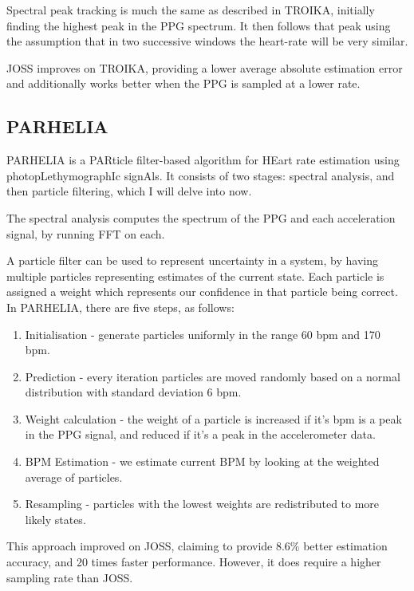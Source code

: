\documentclass[12pt,a4paper,twoside,openright]{report}
\begin{document}
Spectral peak tracking is much the same as described in TROIKA, initially
finding the highest peak in the PPG spectrum. It then follows that peak using
the assumption that in two successive windows the heart-rate will be very
similar.

JOSS improves on TROIKA, providing a lower average absolute estimation error
and additionally works better when the PPG is sampled at a lower rate.


\subsection{PARHELIA}

PARHELIA \cite{Fujita18} is a PARticle filter-based algorithm for HEart rate
estimation using photopLethymographIc signAls. It consists of two stages:
spectral analysis, and then particle filtering, which I will delve into now.

The spectral analysis computes the spectrum of the PPG and each acceleration
signal, by running FFT on each. 

A particle filter can be used to represent uncertainty in a system, by having
multiple particles representing estimates of the current state. Each particle
is assigned a weight which represents our confidence in that particle being
correct. In PARHELIA, there are five steps, as follows:
\begin{enumerate}
	\item Initialisation - generate particles uniformly in the range 60
		bpm and 170 bpm.

	\item Prediction - every iteration particles are moved randomly based on a normal
		distribution with standard deviation 6 bpm.

	\item Weight calculation - the weight of a particle is increased if
		it's bpm is a peak in the PPG signal, and reduced if it's a
		peak in the accelerometer data.

	\item BPM Estimation - we estimate current BPM by looking at the
		weighted average of particles.

	\item Resampling - particles with the lowest weights are redistributed
		to more likely states.
\end{enumerate}

This approach improved on JOSS, claiming to provide 8.6\% better estimation
accuracy, and 20 times faster performance. However, it does require a higher
sampling rate than JOSS.
\end{document}

